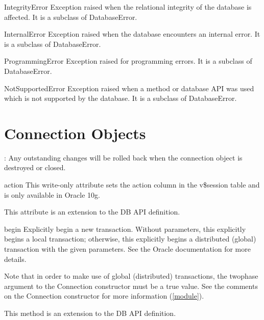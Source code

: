 \documentclass{manual}
\begin{document}
\begin{datadesc}{IntegrityError}
  Exception raised when the relational integrity of the database is affected.
  It is a subclass of DatabaseError.
\end{datadesc}
 
\begin{datadesc}{InternalError}
  Exception raised when the database encounters an internal error.
  It is a subclass of DatabaseError.
\end{datadesc}
 
\begin{datadesc}{ProgrammingError}
  Exception raised for programming errors. It is a subclass of DatabaseError.
\end{datadesc}
 
\begin{datadesc}{NotSupportedError}
  Exception raised when a method or database API was used which is not
  supported by the database. It is a subclass of DatabaseError.
\end{datadesc}
 
\chapter{Connection Objects\label{connobj}}

: Any outstanding changes will be rolled back when the connection
object is destroyed or closed.

\begin{datadesc}{action}
  This write-only attribute sets the action column in the v\$session table and
  is only available in Oracle 10g.

   This attribute is an extension to the DB API definition.
\end{datadesc}

\begin{funcdesc}{begin}{}
  Explicitly begin a new transaction. Without parameters, this explicitly
  begins a local transaction; otherwise, this explicitly begins a distributed
  (global) transaction with the given parameters. See the Oracle documentation
  for more details.

  Note that in order to make use of global (distributed) transactions, the
  twophase argument to the Connection constructor must be a true value. See the
  comments on the Connection constructor for more information (\ref{module}).

   This method is an extension to the DB API definition.
\end{funcdesc}
\end{document}
